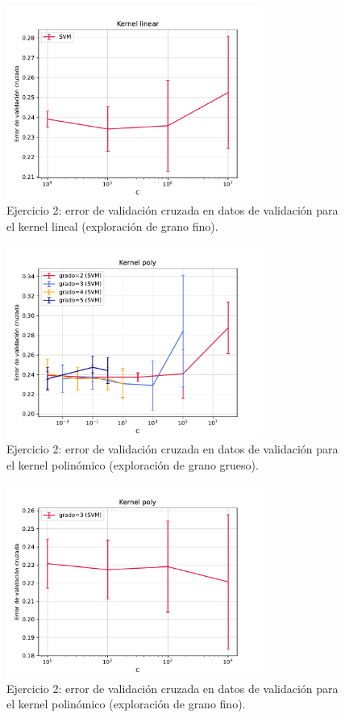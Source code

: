 \documentclass[11pt]{article}
\begin{document}
\begin{figure}[h]
\centering
\includegraphics[width=0.75\textwidth]{fotos/lineal_gf.pdf}
\caption{Ejercicio 2: error de validación cruzada en datos de validación para el kernel lineal (exploración de grano fino).}
\end{figure}

\begin{figure}[h]
\centering
\includegraphics[width=0.75\textwidth]{fotos/poly_gg.pdf}
\caption{Ejercicio 2: error de validación cruzada en datos de validación para el kernel polinómico (exploración de grano grueso).}
\end{figure}

\begin{figure}[h]
\centering
\includegraphics[width=0.75\textwidth]{fotos/poly_gf.pdf}
\caption{Ejercicio 2: error de validación cruzada en datos de validación para el kernel polinómico (exploración de grano fino).}
\end{figure}
\end{document}
